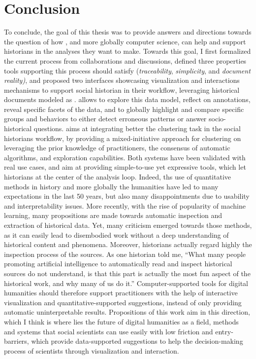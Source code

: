 \section{Conclusion}


To conclude, the goal of this thesis was to provide answers and directions towards the question of how \va, and more globally computer science, can help and support historians in the analyses they want to make.
Towards this goal, I first formalized the current \hsna process from collaborations and discussions, defined three properties tools supporting this process should satisfy (\emph{traceability}, \emph{simplicity}, and \emph{document reality)}, and proposed two interfaces showcasing visualization and interactions mechanisms to support social historian in their workflow, leveraging historical documents modeled as \modelplural.
\combinet allows to explore this data model, reflect on annotations, reveal specific facets of the data, and to globally highlight and compare specific groups and behaviors to either detect erroneous patterns or answer socio-historical questions.
\pkclustering aims at integrating better the clustering task in the social historians workflow, by providing a mixed-initiative approach for clustering on \modelplural leveraging the prior knowledge of practitioners, the consensus of automatic algorithms, and exploration capabilities.
Both systems have been validated with real use cases, and aim at providing simple-to-use yet expressive tools, which let historians at the center of the analysis loop.
Indeed, ths use of quantitative methods in history and more globally the humanities have led to many expectations in the last 50 years, but also many disappointments due to usability and interpretability issues.
More recently, with the rise of popularity of machine learning, many propositions are made towards automatic inspection and extraction of historical data.
Yet, many criticism emerged towards those methods, as it can easily lead to disembodied work without a deep understanding of historical content and phenomena.
Moreover, historians actually regard highly the inspection process of the sources.
As one historian told me, ``What many people promoting artificial intelligence to automatically read and inspect historical sources do not understand, is that this part is actually the most fun aspect of the historical work, and why many of us do it.''
Computer-supported tools for digital humanities should therefore support practitioners with the help of interactive visualization and quantitative-supported suggestions, instead of only providing automatic uninterpretable results.
Propositions of this work aim in this direction, which I think is where lies the future of digital humanities as a field, \ie methods and systems that social scientists can use easily with low friction and entry-barriers, which provide data-supported suggestions to help the decision-making process of scientists through visualization and interaction.





